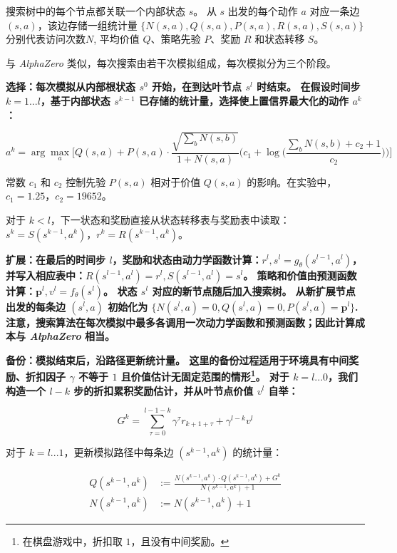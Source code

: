 \documentclass{article}
\newcommand{\alphazero}{\emph{AlphaZero}}
\begin{document}
\begin{appendices}
搜索树中的每个节点都关联一个内部状态 $s$。
从 $s$ 出发的每个动作 $a$ 对应一条边 $(s,a)$，该边存储一组统计量
$\{N(s,a), Q(s,a), P(s,a), R(s,a), S(s,a) \}$分别代表访问次数$N$,
平均价值 $Q$、策略先验 $P$、奖励 $R$ 和状态转移 $S$。

与 \alphazero{} 类似，每次搜索由若干次模拟组成，每次模拟分为三个阶段。

\bf 选择：每次模拟从内部根状态 $s^0$ 开始，在到达叶节点 $s^l$ 时结束。
在假设时间步 $k = 1...l$，基于内部状态 $s^{k-1}$ 已存储的统计量，选择使上置信界最大化的动作 $a^k$\cite{rosin:puct,Silver18AZ}：

\begin{equation} \label{pUCT}
a^{k} = \arg\max_{a}\bigg[
Q(s, a) + P(s, a) \cdot \frac{\sqrt{\sum_b N(s, b)}}{1 + N(s, a)} \bigg(c_1 + \log\Big(\frac{\sum_b N(s, b) + c_2 + 1}{c_2}\Big)\bigg) \bigg]
\end{equation}

常数 $c_1$ 和 $c_2$ 控制先验 $P(s, a)$ 相对于价值 $Q(s, a)$ 的影响。在实验中，$c_1 = 1.25$，$c_2 = 19652$。

对于 $k<l$，下一状态和奖励直接从状态转移表与奖励表中读取：$s^{k} = S(s^{k-1}, a^{k})$，$r^{k} = R(s^{k-1}, a^{k})$。

\bf 扩展：在最后的时间步 $l$，奖励和状态由动力学函数计算：$r^l, s^l = g_\theta(s^{l-1}, a^{l})$，
并写入相应表中：$R(s^{l-1}, a^{l}) = r^l, S(s^{l-1}, a^{l}) = s^l$。
策略和价值由预测函数计算：$\mathbf{p}^l, v^l = f_\theta(s^l)$。
状态 $s^l$ 对应的新节点随后加入搜索树。
从新扩展节点出发的每条边 $(s^l, a)$ 初始化为
$\{ N(s^l, a)=0, Q(s^l, a)=0, P(s^l, a)=\mathbf{p}^l \}$.
注意，搜索算法在每次模拟中最多各调用一次动力学函数和预测函数；因此计算成本与 \alphazero{} 相当。

\bf 备份：模拟结束后，沿路径更新统计量。
这里的备份过程适用于环境具有中间奖励、折扣因子 $\gamma$ 不等于 $1$ 且价值估计无固定范围的情形\footnote{在棋盘游戏中，折扣取 $1$，且没有中间奖励。}。
对于 $k = l...0$，我们构造一个 $l-k$ 步的折扣累积奖励估计，并从叶节点价值 $v^l$ 自举：

\begin{equation}
G^k = \sum_{\tau=0}^{l-1-k}{\gamma ^ \tau r_{k+ 1 +\tau}} + \gamma^{l - k} v^l
\end{equation}

对于 $k = l...1$，更新模拟路径中每条边 $(s^{k-1}, a^{k})$ 的统计量：

\begin{equation}
\begin{aligned}
Q(s^{k-1},a^k) & := \frac{N(s^{k-1},a^k) \cdot Q(s^{k-1},a^k) + G^k}{N(s^{k-1},a^k) + 1} \\
N(s^{k-1},a^k) & := N(s^{k-1},a^k) + 1
\end{aligned}
\end{equation}


\end{appendices}
\end{document}
